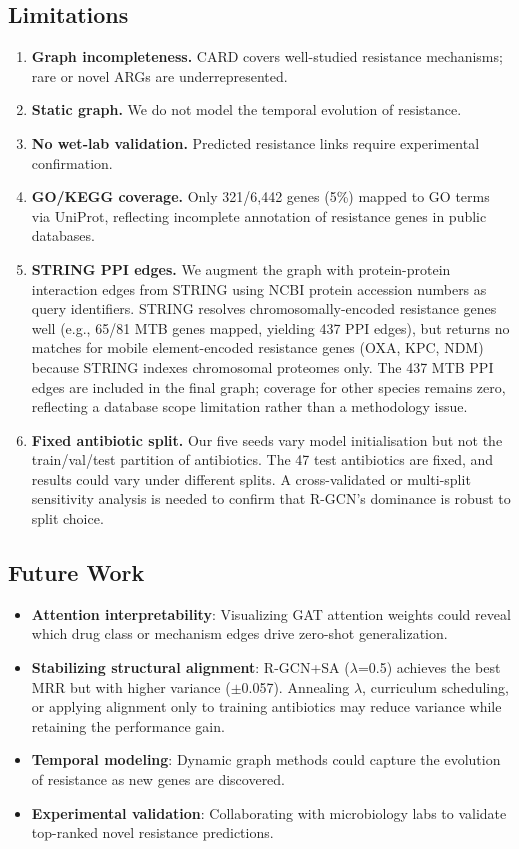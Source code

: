 \documentclass[conference]{IEEEtran}
\begin{document}
\subsection{Limitations}

\begin{enumerate}
\item \textbf{Graph incompleteness.} CARD covers well-studied resistance mechanisms; rare or novel ARGs are underrepresented.
\item \textbf{Static graph.} We do not model the temporal evolution of resistance.
\item \textbf{No wet-lab validation.} Predicted resistance links require experimental confirmation.
\item \textbf{GO/KEGG coverage.} Only 321/6,442 genes (5\%) mapped to GO terms via UniProt, reflecting incomplete annotation of resistance genes in public databases.
\item \textbf{STRING PPI edges.} We augment the graph with protein-protein interaction edges from STRING \cite{szklarczyk2019string} using NCBI protein accession numbers as query identifiers. STRING resolves chromosomally-encoded resistance genes well (e.g., 65/81 MTB genes mapped, yielding 437 PPI edges), but returns no matches for mobile element-encoded resistance genes (OXA, KPC, NDM) because STRING indexes chromosomal proteomes only. The 437 MTB PPI edges are included in the final graph; coverage for other species remains zero, reflecting a database scope limitation rather than a methodology issue.
\item \textbf{Fixed antibiotic split.} Our five seeds vary model initialisation but not the train/val/test partition of antibiotics. The 47 test antibiotics are fixed, and results could vary under different splits. A cross-validated or multi-split sensitivity analysis is needed to confirm that R-GCN's dominance is robust to split choice.
\end{enumerate}

\subsection{Future Work}

\begin{itemize}
\item \textbf{Attention interpretability}: Visualizing GAT attention weights could reveal which drug class or mechanism edges drive zero-shot generalization.
\item \textbf{Stabilizing structural alignment}: R-GCN+SA ($\lambda$=0.5) achieves the best MRR but with higher variance ($\pm$0.057). Annealing $\lambda$, curriculum scheduling, or applying alignment only to training antibiotics may reduce variance while retaining the performance gain.
\item \textbf{Temporal modeling}: Dynamic graph methods could capture the evolution of resistance as new genes are discovered.
\item \textbf{Experimental validation}: Collaborating with microbiology labs to validate top-ranked novel resistance predictions.
\end{itemize}
\end{document}
